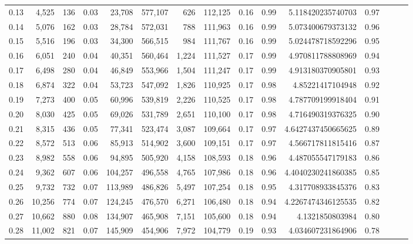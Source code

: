 \begin{tabular}{rrrrrrrrrrrrrrr}
0.13 &   4,525 &    136 &  0.03 &   23,708 &  577,107 &      626 &  112,125 &  0.16 &  0.99 &      5.118420235740703 &      0.97 \\
0.14 &   5,076 &    162 &  0.03 &   28,784 &  572,031 &      788 &  111,963 &  0.16 &  0.99 &      5.073400679373132 &      0.96 \\
0.15 &   5,516 &    196 &  0.03 &   34,300 &  566,515 &      984 &  111,767 &  0.16 &  0.99 &      5.024478718592296 &      0.95 \\
0.16 &   6,051 &    240 &  0.04 &   40,351 &  560,464 &    1,224 &  111,527 &  0.17 &  0.99 &      4.970811788808969 &      0.94 \\
0.17 &   6,498 &    280 &  0.04 &   46,849 &  553,966 &    1,504 &  111,247 &  0.17 &  0.99 &      4.913180370905801 &      0.93 \\
0.18 &   6,874 &    322 &  0.04 &   53,723 &  547,092 &    1,826 &  110,925 &  0.17 &  0.98 &       4.85221417104948 &      0.92 \\
0.19 &   7,273 &    400 &  0.05 &   60,996 &  539,819 &    2,226 &  110,525 &  0.17 &  0.98 &      4.787709199918404 &      0.91 \\
0.20 &   8,030 &    425 &  0.05 &   69,026 &  531,789 &    2,651 &  110,100 &  0.17 &  0.98 &      4.716490319376325 &      0.90 \\
0.21 &   8,315 &    436 &  0.05 &   77,341 &  523,474 &    3,087 &  109,664 &  0.17 &  0.97 &     4.6427437450665625 &      0.89 \\
0.22 &   8,572 &    513 &  0.06 &   85,913 &  514,902 &    3,600 &  109,151 &  0.17 &  0.97 &      4.566717811815416 &      0.87 \\
0.23 &   8,982 &    558 &  0.06 &   94,895 &  505,920 &    4,158 &  108,593 &  0.18 &  0.96 &      4.487055547179183 &      0.86 \\
0.24 &   9,362 &    607 &  0.06 &  104,257 &  496,558 &    4,765 &  107,986 &  0.18 &  0.96 &     4.4040230241860385 &      0.85 \\
0.25 &   9,732 &    732 &  0.07 &  113,989 &  486,826 &    5,497 &  107,254 &  0.18 &  0.95 &      4.317708933845376 &      0.83 \\
0.26 &  10,256 &    774 &  0.07 &  124,245 &  476,570 &    6,271 &  106,480 &  0.18 &  0.94 &     4.2267474346125535 &      0.82 \\
0.27 &  10,662 &    880 &  0.08 &  134,907 &  465,908 &    7,151 &  105,600 &  0.18 &  0.94 &        4.1321850803984 &      0.80 \\
0.28 &  11,002 &    821 &  0.07 &  145,909 &  454,906 &    7,972 &  104,779 &  0.19 &  0.93 &      4.034607231864906 &      0.78 \\

\end{tabular}

